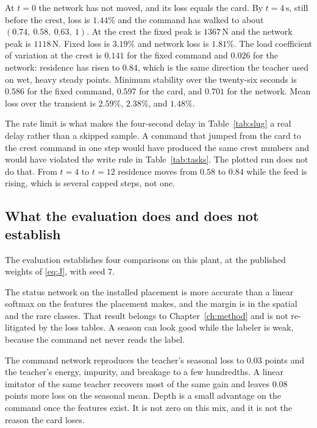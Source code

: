 At \(t=0\) the network has not moved, and its loss equals the card. By \(t=4\,\mathrm{s}\), still before the crest, loss is \(1.44\%\) and the command has walked to about \((0.74,\ 0.58,\ 0.63,\ 1)\). At the crest the fixed peak is \(1367\,\mathrm{N}\) and the network peak is \(1118\,\mathrm{N}\). Fixed loss is \(3.19\%\) and network loss is \(1.81\%\). The load coefficient of variation at the crest is \(0.141\) for the fixed command and \(0.026\) for the network: residence has risen to \(0.84\), which is the same direction the teacher used on wet, heavy steady points. Minimum stability over the twenty-six seconds is \(0.586\) for the fixed command, \(0.597\) for the card, and \(0.701\) for the network. Mean loss over the transient is \(2.59\%\), \(2.38\%\), and \(1.48\%\).

The rate limit is what makes the four-second delay in Table~\ref{tab:slug} a real delay rather than a skipped sample. A command that jumped from the card to the crest command in one step would have produced the same crest numbers and would have violated the write rule in Table~\ref{tab:tasks}. The plotted run does not do that. From \(t=4\) to \(t=12\) residence moves from \(0.58\) to \(0.84\) while the feed is rising, which is several capped steps, not one.

\subsection{What the evaluation does and does not establish}

The evaluation establishes four comparisons on this plant, at the published weights of \eqref{eq:J}, with seed \(7\).

The status network on the installed placement is more accurate than a linear softmax on the features the placement makes, and the margin is in the spatial and the rare classes. That result belongs to Chapter~\ref{ch:method} and is not re-litigated by the loss tables. A season can look good while the labeler is weak, because the command net never reads the label.

The command network reproduces the teacher's seasonal loss to \(0.03\) points and the teacher's energy, impurity, and breakage to a few hundredths. A linear imitator of the same teacher recovers most of the same gain and leaves \(0.08\) points more loss on the seasonal mean. Depth is a small advantage on the command once the features exist. It is not zero on this mix, and it is not the reason the card loses.

